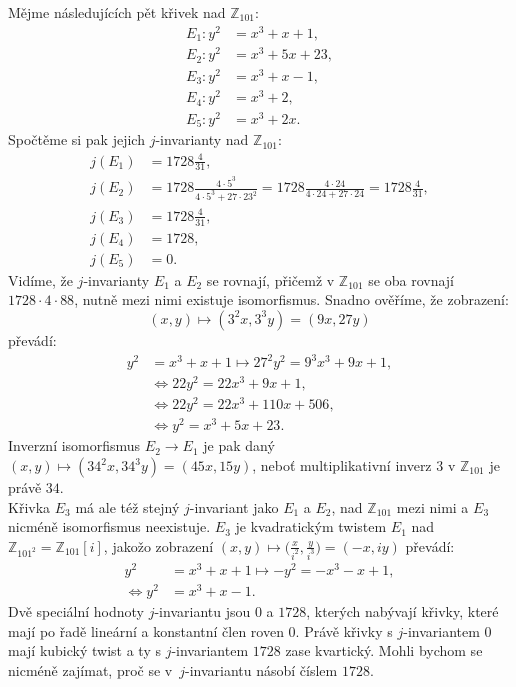 \documentclass [12pt]{report}
\begin{document}
Mějme následujících pět křivek nad $\mathbb{Z}_{101}$:
\begin{align*}
E_1 : y^2 &= x^3+x+1,\\
E_2 : y^2 &= x^3+5x+23,\\
E_3 : y^2 &= x^3+x-1,\\
E_4 : y^2 &= x^3+2,\\
E_5 : y^2 &= x^3+2x.
\end{align*}
Spočtěme si pak jejich $j$-invarianty nad $\mathbb{Z}_{101}$:
\begin{align*}
j(E_1) &= 1728 \frac{4}{31},\\
j(E_2) &= 1728 \frac{4 \cdot 5^3}{4 \cdot 5^3+27 \cdot 23^2} = 1728 \frac{4 \cdot 24}{4 \cdot 24 + 27 \cdot 24} = 1728 \frac{4}{31},\\
j(E_3) &= 1728 \frac{4}{31},\\
j(E_4) &= 1728,\\
j(E_5) &= 0.
\end{align*}
Vidíme, že $j$-invarianty $E_1$ a $E_2$ se rovnají, přičemž v $\mathbb{Z}_{101}$ se oba rovnají $1728 \cdot 4 \cdot 88$, nutně mezi nimi existuje isomorfismus. Snadno ověříme, že zobrazení:
\begin{equation*}
(x,y) \mapsto (3^2 x, 3^3 y) = (9x,27y) 
\end{equation*}
převádí:
\begin{align*}
y^2 &= x^3+x+1 \mapsto 27^2 y^2 = 9^3 x^3 + 9x + 1,\\
&\Leftrightarrow 22 y^2 = 22 x^3 + 9x + 1,\\
&\Leftrightarrow 22 y^2 = 22 x^3 + 110x + 506,\\
&\Leftrightarrow y^2 = x^3 + 5x + 23.
\end{align*}
Inverzní isomorfismus $E_2 \longrightarrow E_1$ je pak daný $(x,y) \mapsto (34^2 x, 34^3 y) = (45x,15y)$, neboť multiplikativní inverz $3$ v $\mathbb{Z}_{101}$ je právě $34$.\\

Křivka $E_3$ má ale též stejný $j$-invariant jako $E_1$ a $E_2$, nad $\mathbb{Z}_{101}$ mezi nimi a $E_3$ nicméně isomorfismus neexistuje. $E_3$ je kvadratickým twistem $E_1$ nad $\mathbb{Z}_{101^2} = \mathbb{Z}_{101}[i]$, jakožo zobrazení $(x,y) \mapsto \Big(\frac{x}{i^2}, \frac{y}{i^3}\Big) = (-x,iy)$ převádí:
\begin{align*}
y^2 &= x^3+x+1 \mapsto -y^2 = -x^3-x+1,\\
\Leftrightarrow y^2 &=  x^3 + x - 1.
\end{align*}
Dvě speciální hodnoty $j$-invariantu jsou $0$ a $1728$, kterých nabývají křivky, které mají po řadě lineární a konstantní člen roven $0$. Právě křivky s $j$-invariantem $0$ mají kubický twist a ty s $j$-invariantem $1728$ zase kvartický. Mohli bychom se nicméně zajímat, proč se v~$j$-invariantu násobí číslem $1728$.\\
\end{document}
